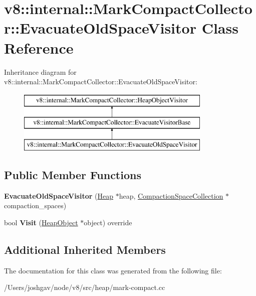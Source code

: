 \hypertarget{classv8_1_1internal_1_1_mark_compact_collector_1_1_evacuate_old_space_visitor}{}\section{v8\+:\+:internal\+:\+:Mark\+Compact\+Collector\+:\+:Evacuate\+Old\+Space\+Visitor Class Reference}
\label{classv8_1_1internal_1_1_mark_compact_collector_1_1_evacuate_old_space_visitor}
Inheritance diagram for v8\+:\+:internal\+:\+:Mark\+Compact\+Collector\+:\+:Evacuate\+Old\+Space\+Visitor\+:\begin{figure}[H]
\begin{center}
\leavevmode
\includegraphics[height=3.000000cm]{classv8_1_1internal_1_1_mark_compact_collector_1_1_evacuate_old_space_visitor}
\end{center}
\end{figure}
\subsection*{Public Member Functions}
\begin{DoxyCompactItemize}
\item 
{\bfseries Evacuate\+Old\+Space\+Visitor} (\hyperlink{classv8_1_1internal_1_1_heap}{Heap} $\ast$heap, \hyperlink{classv8_1_1internal_1_1_compaction_space_collection}{Compaction\+Space\+Collection} $\ast$compaction\+\_\+spaces)\hypertarget{classv8_1_1internal_1_1_mark_compact_collector_1_1_evacuate_old_space_visitor_a185c0053fe6c830a2c1e5dc187e5bdc0}{}\label{classv8_1_1internal_1_1_mark_compact_collector_1_1_evacuate_old_space_visitor_a185c0053fe6c830a2c1e5dc187e5bdc0}

\item 
bool {\bfseries Visit} (\hyperlink{classv8_1_1internal_1_1_heap_object}{Heap\+Object} $\ast$object) override\hypertarget{classv8_1_1internal_1_1_mark_compact_collector_1_1_evacuate_old_space_visitor_a0988c1f1e9178cae719b02d11b36fce8}{}\label{classv8_1_1internal_1_1_mark_compact_collector_1_1_evacuate_old_space_visitor_a0988c1f1e9178cae719b02d11b36fce8}

\end{DoxyCompactItemize}
\subsection*{Additional Inherited Members}


The documentation for this class was generated from the following file\+:\begin{DoxyCompactItemize}
\item 
/\+Users/joshgav/node/v8/src/heap/mark-\/compact.\+cc\end{DoxyCompactItemize}
